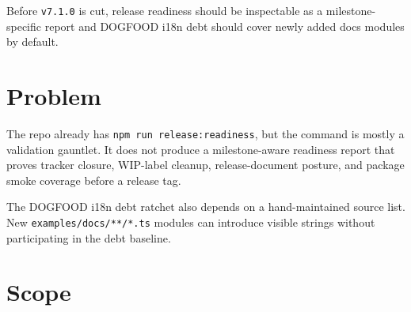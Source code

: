 Before \texttt{v\allowbreak{}7\allowbreak{}.\allowbreak{}1\allowbreak{}.\allowbreak{}0} is cut, release readiness should be inspectable as a milestone-specific report and DOGFOOD i18n debt should cover newly added docs modules by default.

\section{Problem}\label{record-214-problem}

The repo already has \texttt{n\allowbreak{}p\allowbreak{}m\allowbreak{} \allowbreak{}r\allowbreak{}u\allowbreak{}n\allowbreak{} \allowbreak{}r\allowbreak{}e\allowbreak{}l\allowbreak{}e\allowbreak{}a\allowbreak{}s\allowbreak{}e\allowbreak{}:\allowbreak{}r\allowbreak{}e\allowbreak{}a\allowbreak{}d\allowbreak{}i\allowbreak{}n\allowbreak{}e\allowbreak{}s\allowbreak{}s}, but the command is mostly a validation gauntlet. It does not produce a milestone-aware readiness report that proves tracker closure, WIP-label cleanup, release-document posture, and package smoke coverage before a release tag.

The DOGFOOD i18n debt ratchet also depends on a hand-maintained source list. New \texttt{e\allowbreak{}x\allowbreak{}a\allowbreak{}m\allowbreak{}p\allowbreak{}l\allowbreak{}e\allowbreak{}s\allowbreak{}/\allowbreak{}d\allowbreak{}o\allowbreak{}c\allowbreak{}s\allowbreak{}/\allowbreak{}*\allowbreak{}*\allowbreak{}/\allowbreak{}*\allowbreak{}.\allowbreak{}t\allowbreak{}s} modules can introduce visible strings without participating in the debt baseline.

\section{Scope}\label{record-214-scope}

